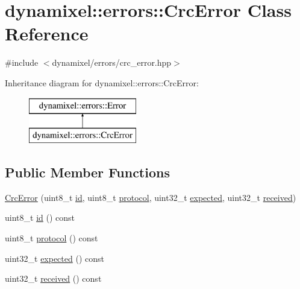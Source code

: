 \hypertarget{classdynamixel_1_1errors_1_1_crc_error}{}\section{dynamixel\+:\+:errors\+:\+:Crc\+Error Class Reference}
\label{classdynamixel_1_1errors_1_1_crc_error}


{\ttfamily \#include $<$dynamixel/errors/crc\+\_\+error.\+hpp$>$}

Inheritance diagram for dynamixel\+:\+:errors\+:\+:Crc\+Error\+:\begin{figure}[H]
\begin{center}
\leavevmode
\includegraphics[height=2.000000cm]{classdynamixel_1_1errors_1_1_crc_error}
\end{center}
\end{figure}
\subsection*{Public Member Functions}
\begin{DoxyCompactItemize}
\item 
\hyperlink{classdynamixel_1_1errors_1_1_crc_error_a2aaa5fc1ec34b700c5f610b08ddb0199}{Crc\+Error} (uint8\+\_\+t \hyperlink{classdynamixel_1_1errors_1_1_crc_error_a392c3a9df96a85ab8e0437ffe61b08f8}{id}, uint8\+\_\+t \hyperlink{classdynamixel_1_1errors_1_1_crc_error_acf3ae167b281f8b0ce6f4ca36eea3b83}{protocol}, uint32\+\_\+t \hyperlink{classdynamixel_1_1errors_1_1_crc_error_a9d1848929cf03a801406a59f3bc0d8e6}{expected}, uint32\+\_\+t \hyperlink{classdynamixel_1_1errors_1_1_crc_error_afa3c4446e36cb87f3eec0f7cdc9bbfa4}{received})
\item 
uint8\+\_\+t \hyperlink{classdynamixel_1_1errors_1_1_crc_error_a392c3a9df96a85ab8e0437ffe61b08f8}{id} () const 
\item 
uint8\+\_\+t \hyperlink{classdynamixel_1_1errors_1_1_crc_error_acf3ae167b281f8b0ce6f4ca36eea3b83}{protocol} () const 
\item 
uint32\+\_\+t \hyperlink{classdynamixel_1_1errors_1_1_crc_error_a9d1848929cf03a801406a59f3bc0d8e6}{expected} () const 
\item 
uint32\+\_\+t \hyperlink{classdynamixel_1_1errors_1_1_crc_error_afa3c4446e36cb87f3eec0f7cdc9bbfa4}{received} () const 
\end{DoxyCompactItemize}


